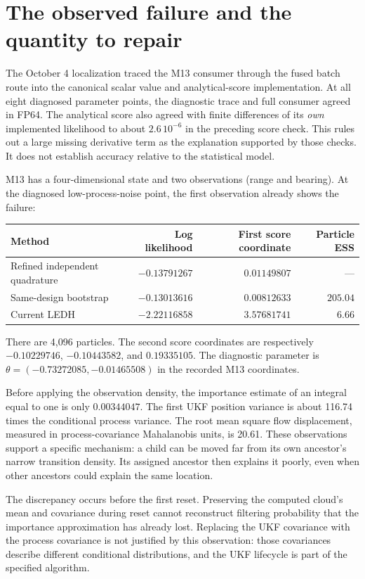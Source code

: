 \documentclass[11pt]{article}
\begin{document}
\section{The observed failure and the quantity to repair}

The October 4 localization traced the M13 consumer through the fused batch
route into the canonical scalar value and analytical-score implementation.
At all eight diagnosed parameter points, the diagnostic trace and full
consumer agreed in FP64. The analytical score also agreed with finite
differences of its \emph{own} implemented likelihood to about
$2.6\,10^{-6}$ in the preceding score check. This rules out a large missing
derivative term as the explanation supported by those checks. It does not
establish accuracy relative to the statistical model.

M13 has a four-dimensional state and two observations (range and bearing).
At the diagnosed low-process-noise point, the first observation already shows
the failure:
\begin{center}
\begin{tabular}{lrrr}
\toprule
Method & Log likelihood & First score coordinate & Particle ESS\\
\midrule
Refined independent quadrature & $-0.13791267$ & $0.01149807$ & ---\\
Same-design bootstrap & $-0.13013616$ & $0.00812633$ & $205.04$\\
Current LEDH & $-2.22116858$ & $3.57681741$ & $6.66$\\
\bottomrule
\end{tabular}
\end{center}
There are 4,096 particles. The second score coordinates are respectively
$-0.10229746$, $-0.10443582$, and $0.19335105$.
The diagnostic parameter is
$\theta=(-0.73272085,-0.01465508)$ in the recorded M13 coordinates.

Before applying the observation density, the importance estimate of an
integral equal to one is only $0.00344047$. The first UKF position variance
is about 116.74 times the conditional process variance. The root mean square
flow displacement, measured in process-covariance Mahalanobis units, is
20.61. These observations support a specific mechanism: a child can be moved
far from its own ancestor's narrow transition density. Its assigned
ancestor then explains it poorly, even when other ancestors could explain
the same location.

The discrepancy occurs before the first reset. Preserving the computed
cloud's mean and covariance during reset cannot reconstruct filtering
probability that the importance approximation has already lost.
Replacing the UKF covariance with the process covariance is not justified
by this observation: those covariances describe different conditional
distributions, and the UKF lifecycle is part of the specified algorithm.
\end{document}
